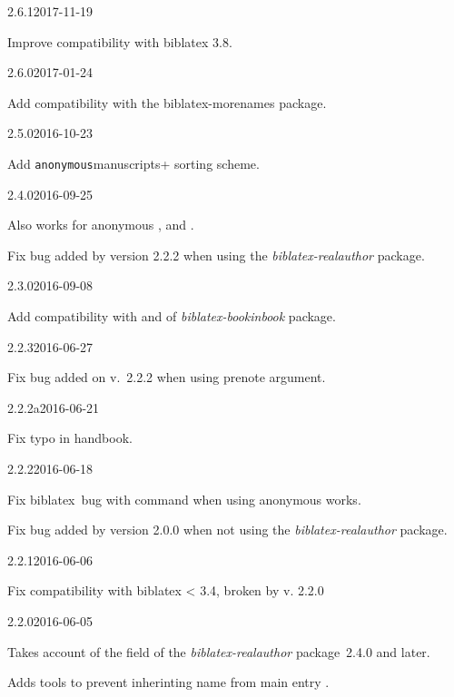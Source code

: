 \documentclass{ltxdockit}[2011/03/25]
\newcommand{\biblatex}{biblatex\xspace}
\begin{document}
\begin{changelog}

\begin{release}{2.6.1}{2017-11-19}
	\item Improve compatibility with biblatex 3.8.
\end{release}

\begin{release}{2.6.0}{2017-01-24}
	\item Add compatibility with the biblatex-morenames package.
\end{release}

\begin{release}{2.5.0}{2016-10-23}
  \item Add \verb+anonymous+manuscripts+ sorting scheme.
\end{release}

\begin{release}{2.4.0}{2016-09-25}
  \item Also works for anonymous ,  and .
  \item Fix bug added by version 2.2.2 when using the \emph{biblatex-realauthor} package.
\end{release}

\begin{release}{2.3.0}{2016-09-08}
  \item Add compatibility with  and  of \emph{biblatex-bookinbook} package.
\end{release}

\begin{release}{2.2.3}{2016-06-27}
  \item Fix bug added on v.~2.2.2 when using prenote argument.
 \end{release}

\begin{release}{2.2.2a}{2016-06-21}
  \item Fix typo in handbook.
 \end{release}

\begin{release}{2.2.2}{2016-06-18}
  \item Fix \biblatex\ bug with  \expandafter\cs\expandafter{\prm{xx}cites} command when using anonymous works.
  \item Fix bug added by version 2.0.0 when not using the \emph{biblatex-realauthor} package.
 \end{release}
\begin{release}{2.2.1}{2016-06-06}
 \item Fix compatibility with biblatex < 3.4, broken by v. 2.2.0
\end{release}
\begin{release}{2.2.0}{2016-06-05}
  \item Takes account of the  field of the \emph{biblatex-realauthor} package~2.4.0 and later.
  \item Adds tools to prevent inherinting name from main entry .
\end{release}


\end{changelog}
\end{document}
